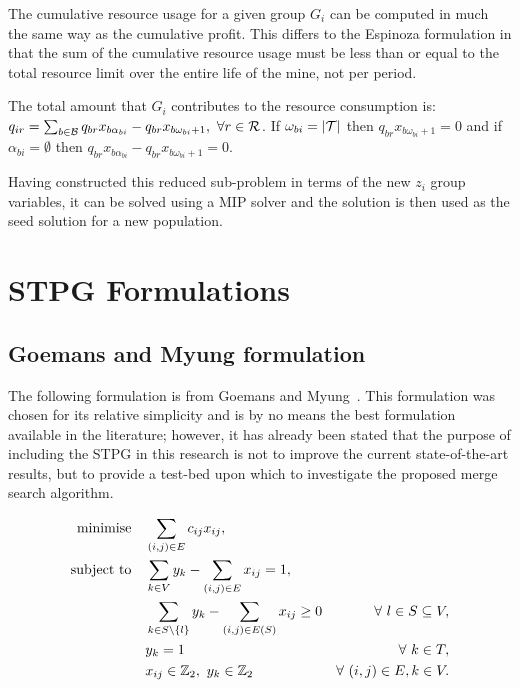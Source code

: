 \documentclass[journal]{IEEEtran}
\begin{document}
The cumulative resource usage for a given group $G_i$ can be computed in much the same way as the cumulative profit. This differs to the Espinoza formulation in that the sum of the cumulative resource usage must be less than or equal to the total resource limit over the entire life of the mine, not per period.
\begin{prop}\label{prop:merge-group-resource}
The total amount that $G_i$ contributes to the resource consumption is: $q_{ir} = \sum_{b \in \S{B}} q_{br}x_{b\alpha_{bi}} - q_{br}x_{b\omega_{bi}+1},\ \forall r \in \S{R}$. If $\omega_{bi} = |\S{T}|$ then $q_{br}x_{b\omega_{bi}+1} = 0$ and if \(\alpha_{bi} = \emptyset\) then \(q_{br}x_{b\alpha_{bi}} - q_{br}x_{b\omega_{bi}+1} = 0\).
\end{prop}
%
Having constructed this reduced sub-problem in terms of the new $z_i$ group variables, it can be solved using a MIP solver and the solution is then used as the seed solution for a new population.

\section{STPG Formulations}\label{app:stpg}
\subsection*{Goemans and Myung formulation}
The following formulation is from Goemans and Myung~\cite{goemans}. This formulation was chosen for its relative simplicity and is by no means the best formulation available in the literature; however, it has already been stated that the purpose of including the STPG in this research is not to improve the current state-of-the-art results, but to provide a test-bed upon which to investigate the proposed merge search algorithm.

{\footnotesize
\begin{align}
\Min \quad & \displaystyle\sum_{(i,j) \in E} c_{ij}x_{ij},\label{eq:stpg_form}\\
\ST \quad & \displaystyle\sum_{k \in V}y_{k} - \displaystyle\sum_{(i,j) \in E}x_{ij} = 1,\nonumber\\
& \displaystyle\sum_{k \in S\setminus \{l\}}y_{k} - \displaystyle\sum_{(i,j) \in E(S)}x_{ij} \geq 0 & \forall\ l \in S \subseteq V,\nonumber\\
& y_k = 1 & \forall\ k \in T,\nonumber\\
& x_{ij} \in \Bin,\ y_k \in \Bin & \forall\ (i,j) \in E, k \in V\nonumber.
\end{align}
}
\end{document}
